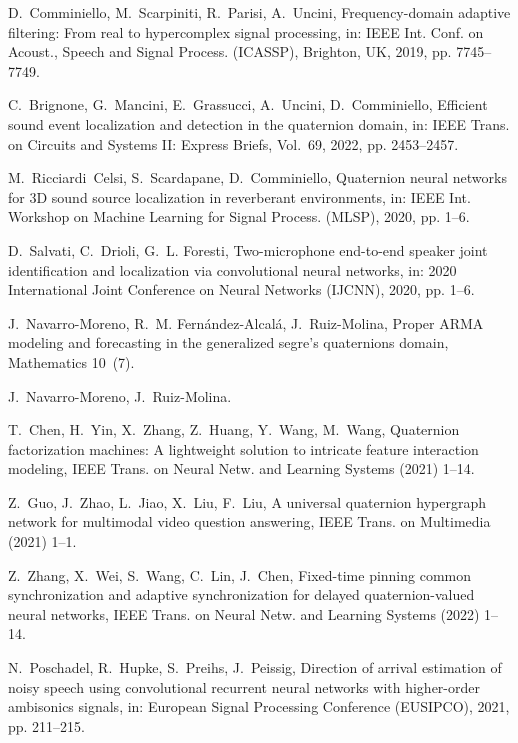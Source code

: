 \documentclass[3p, preprint, twocolumn]{elsarticle}
\begin{document}
\begin{thebibliography}{10}
D.~Comminiello, M.~Scarpiniti, R.~Parisi, A.~Uncini, Frequency-domain adaptive
  filtering: From real to hypercomplex signal processing, in: IEEE Int. Conf.
  on Acoust., Speech and Signal Process. (ICASSP), Brighton, UK, 2019, pp.
  7745--7749.

C.~Brignone, G.~Mancini, E.~Grassucci, A.~Uncini, D.~Comminiello, Efficient
  sound event localization and detection in the quaternion domain, in: IEEE
  Trans. on Circuits and Systems II: Express Briefs, Vol.~69, 2022, pp.
  2453--2457.

M.~Ricciardi~Celsi, S.~Scardapane, D.~Comminiello, Quaternion neural networks
  for 3{D} sound source localization in reverberant environments, in: IEEE Int.
  Workshop on Machine Learning for Signal Process. (MLSP), 2020, pp. 1--6.

D.~Salvati, C.~Drioli, G.~L. Foresti, Two-microphone end-to-end speaker joint
  identification and localization via convolutional neural networks, in: 2020
  International Joint Conference on Neural Networks (IJCNN), 2020, pp. 1--6.

J.~Navarro-Moreno, R.~M. Fernández-Alcalá, J.~Ruiz-Molina, Proper {ARMA}
  modeling and forecasting in the generalized segre's quaternions domain,
  Mathematics 10~(7).

J.~Navarro-Moreno, J.~Ruiz-Molina.

T.~Chen, H.~Yin, X.~Zhang, Z.~Huang, Y.~Wang, M.~Wang, Quaternion factorization
  machines: A lightweight solution to intricate feature interaction modeling,
  IEEE Trans. on Neural Netw. and Learning Systems (2021) 1--14.

Z.~Guo, J.~Zhao, L.~Jiao, X.~Liu, F.~Liu, A universal quaternion hypergraph
  network for multimodal video question answering, IEEE Trans. on Multimedia
  (2021) 1--1.

Z.~Zhang, X.~Wei, S.~Wang, C.~Lin, J.~Chen, Fixed-time pinning common
  synchronization and adaptive synchronization for delayed quaternion-valued
  neural networks, IEEE Trans. on Neural Netw. and Learning Systems (2022)
  1--14.

N.~Poschadel, R.~Hupke, S.~Preihs, J.~Peissig, Direction of arrival estimation
  of noisy speech using convolutional recurrent neural networks with
  higher-order ambisonics signals, in: European Signal Processing Conference
  (EUSIPCO), 2021, pp. 211--215.


\end{thebibliography}
\end{document}
